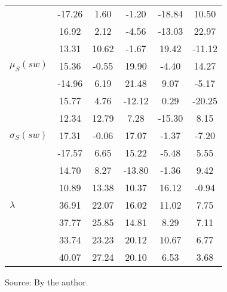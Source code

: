 \begin{table}[h!]
\begin{center}
\begin{tabular}{| l || c | c | c | c | c |}
 & -17.26  & 1.60  & -1.20  & -18.84  & 10.50 \\
 & 16.92  & 2.12  & -4.56  & -13.03  & 22.97 \\
 & 13.31  & 10.62  & -1.67  & 19.42  & -11.12 \\\hline
$\mu_S(sw)$ & 15.36  & -0.55  & 19.90  & -4.40  & 14.27 \\
 & -14.96  & 6.19  & 21.48  & 9.07  & -5.17 \\
 & 15.77  & 4.76  & -12.12  & 0.29  & -20.25 \\
 & 12.34  & 12.79  & 7.28  & -15.30  & 8.15 \\\hline
$\sigma_S(sw)$ & 17.31  & -0.06  & 17.07  & -1.37  & -7.20 \\
 & -17.57  & 6.65  & 15.22  & -5.48  & 5.55 \\
 & 14.70  & 8.27  & -13.80  & -1.36  & 9.42 \\
 & 10.89  & 13.38  & 10.37  & 16.12  & -0.94 \\\hline\hline
$\lambda$ & 36.91  & 22.07  & 16.02  & 11.02  & 7.75 \\
 & 37.77  & 25.85  & 14.81  & 8.29  & 7.11 \\
 & 33.74  & 23.23  & 20.12  & 10.67  & 6.77 \\
 & 40.07  & 27.24  & 20.10  & 6.53  & 3.68 \\\hline
\end{tabular}
\begin{flushleft}\footnotesize
		Source: By the author.\
\end{flushleft}
\end{center}
\end{table}
